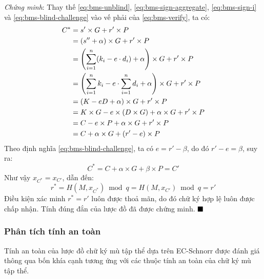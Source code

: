 \textit{Chứng minh}: Thay thế \eqref{eq:bms-unblind}, \eqref{eq:bms-sign-aggregate}, \eqref{eq:bms-sign-i} và \eqref{eq:bms-blind-challenge} vào vế phải của \eqref{eq:bms-verify}, ta có:
\begin{align}
    C^* &= s' \times G + r' \times P \notag \\
        &= (s'' + \alpha) \times G + r' \times P \notag \\
        &= \left( \sum_{i=1}^{n} (k_i - e \cdot d_i) + \alpha \right) \times G + r' \times P \notag \\
        &= \left( \sum_{i=1}^{n} k_i - e \cdot \sum_{i=1}^{n} d_i + \alpha \right) \times G + r' \times P \notag \\
        &= (K - e D + \alpha) \times G + r' \times P \notag \\
        &= K \times G - e \times (D \times G) + \alpha \times G + r' \times P \notag \\
        &= C - e \times P + \alpha \times G + r' \times P \notag \\
        &= C + \alpha \times G + (r' - e) \times P
        \label{eq:bms-proof-1}
\end{align}
Theo định nghĩa \eqref{eq:bms-blind-challenge}, ta có $e = r' - \beta$, do đó $r' - e = \beta$, suy ra:
\begin{equation}
    C^* = C + \alpha \times G + \beta \times P = C'
    \label{eq:bms-proof-2}
\end{equation}
Như vậy $x_{C^*} = x_{C'}$, dẫn đến:
\begin{equation}
    r^* = H(M, x_{C^*}) \bmod q = H(M, x_{C'}) \bmod q = r'
    \label{eq:bms-proof-3}
\end{equation}
Điều kiện xác minh $r^* = r'$ luôn được thoả mãn, do đó chữ ký hợp lệ luôn được chấp nhận. Tính đúng đắn của lược đồ đã được chứng minh. $\hfill \blacksquare$

\subsubsection{Phân tích tính an toàn}

Tính an toàn của lược đồ chữ ký mù tập thể dựa trên EC-Schnorr được đánh giá thông qua bốn khía cạnh tương ứng với các thuộc tính an toàn của chữ ký mù tập thể.

